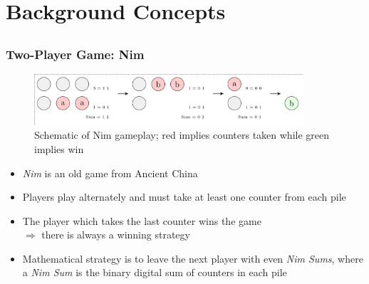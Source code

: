 \documentclass{beamer}
\begin{document}
\section{Background Concepts}

\subsection{}
\begin{framefont}{\footnotesize}
  \begin{frame}
    \frametitle{Two-Player Game: Nim}
    \begin{figure}
      \centering
      \includegraphics[trim={0.3cm -0.2cm 0.3cm 0.3cm},clip,width=10cm]{nim.png}
      \caption{Schematic of Nim gameplay; red implies counters taken while green implies win}
    \end{figure}
    \begin{itemize}[<+->]
      \setlength\itemsep{0.8em}
    \item \textit{Nim} is an old game from Ancient China 
    \item Players play alternately and must take at least one counter from each pile
    \item The player which takes the last counter wins the game \\ $\Longrightarrow$ there is always a winning strategy
    \item Mathematical strategy is to leave the next player with even \textit{Nim Sums}, where a \textit{Nim Sum} is the binary digital sum of counters in each pile 
    \end{itemize}
  \end{frame}
\end{framefont}
\end{document}
